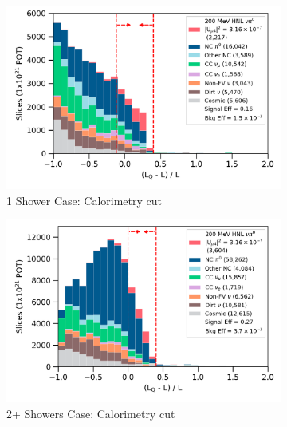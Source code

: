 \begin{figure}[ht!]
        \begin{subfigure}[b]{0.495\textwidth}   
            \centering 
            \includegraphics[width=\textwidth]{opt0frac_one_shw_precut}
            \caption{1 Shower Case: Calorimetry cut}%
        \end{subfigure}
        \hfill
        \begin{subfigure}[b]{0.495\textwidth}   
            \centering 
            \includegraphics[width=\textwidth]{opt0frac_two_shw_precut}
            \caption{2+ Showers Case: Calorimetry cut}%
        \end{subfigure}
        \hfill
	\centering
        \begin{subfigure}[b]{0.495\textwidth}   
            \centering 

\end{subfigure}
\end{figure}
